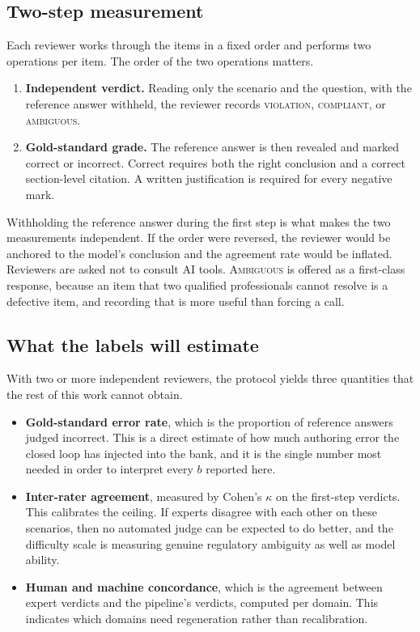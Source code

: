 \subsection{Two-step measurement}
Each reviewer works through the items in a fixed order and performs two
operations per item. The order of the two operations matters.

\begin{enumerate}[nosep,leftmargin=1.6em]
  \item \textbf{Independent verdict.} Reading only the scenario and the
        question, with the reference answer withheld, the reviewer
        records \textsc{violation}, \textsc{compliant}, or
        \textsc{ambiguous}.
  \item \textbf{Gold-standard grade.} The reference answer is then
        revealed and marked correct or incorrect. Correct requires both
        the right conclusion and a correct section-level citation. A
        written justification is required for every negative mark.
\end{enumerate}

Withholding the reference answer during the first step is what makes the
two measurements independent. If the order were reversed, the reviewer
would be anchored to the model's conclusion and the agreement rate would
be inflated. Reviewers are asked not to consult AI tools.
\textsc{Ambiguous} is offered as a first-class response, because an item
that two qualified professionals cannot resolve is a defective item, and
recording that is more useful than forcing a call.

\subsection{What the labels will estimate}
With two or more independent reviewers, the protocol yields three
quantities that the rest of this work cannot obtain.

\begin{itemize}[nosep,leftmargin=1.4em]
  \item \textbf{Gold-standard error rate}, which is the proportion of
        reference answers judged incorrect. This is a direct estimate of
        how much authoring error the closed loop has injected into the
        bank, and it is the single number most needed in order to
        interpret every $b$ reported here.
  \item \textbf{Inter-rater agreement}, measured by Cohen's $\kappa$ on
        the first-step verdicts. This calibrates the ceiling. If experts
        disagree with each other on these scenarios, then no automated
        judge can be expected to do better, and the difficulty scale is
        measuring genuine regulatory ambiguity as well as model ability.
  \item \textbf{Human and machine concordance}, which is the agreement
        between expert verdicts and the pipeline's verdicts, computed per
        domain. This indicates which domains need regeneration rather
        than recalibration.
\end{itemize}

